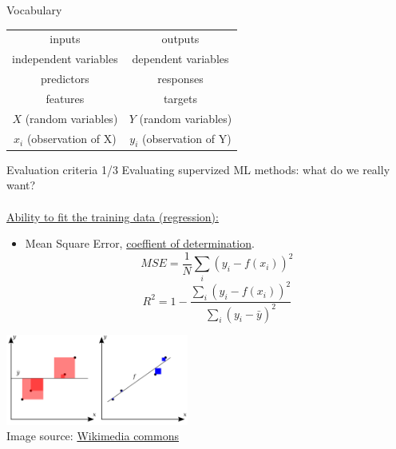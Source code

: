 \documentclass{beamer}
\begin{document}
\begin{frame}{Vocabulary}
\begin{center}
\begin{tabular}{cc}
inputs & outputs\\
independent variables & dependent variables\\
predictors & responses\\
features & targets\\
$X$ (random variables) & $Y$ (random variables)\\
$x_i$ (observation of X) & $y_i$ (observation of Y)
\end{tabular}
\end{center}
\end{frame}

\begin{frame}{Evaluation criteria 1/3}
Evaluating supervized ML methods: what do we really want?\\
~\\
\underline{Ability to fit the training data (regression):}
\begin{itemize}
\item Mean Square Error, \href{https://en.wikipedia.org/wiki/Coefficient_of_determination}{coeffient of determination}.
$$MSE = \frac{1}{N}\sum_i \left(y_i - f(x_i)\right)^2$$
$$R^2 = 1-\frac{\sum_i \left(y_i - f(x_i)\right)^2}{\sum_i \left(y_i - \bar{y}\right)^2}$$
\end{itemize}
\begin{center}
\includegraphics[width=6cm]{img/R2.png}\\
\tiny Image source: \href{https://commons.wikimedia.org/wiki/File:Coefficient_of_Determination.svg}{Wikimedia commons}
\end{center}
\end{frame}
\end{document}
